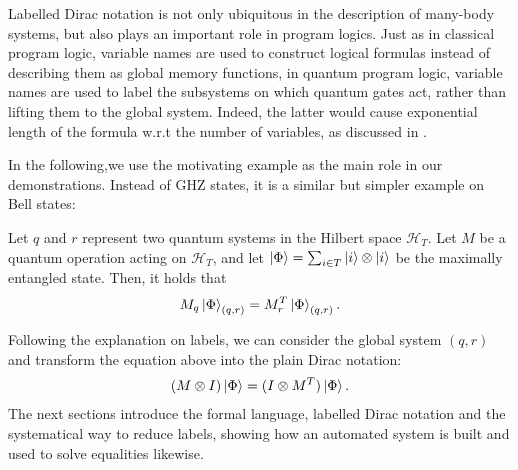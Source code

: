 Labelled Dirac notation is not only ubiquitous in the description of many-body systems, but also plays an important role in program logics. Just as in classical program logic, variable names are used to construct logical formulas instead of describing them as global memory functions, in quantum program logic, variable names are used to label the subsystems on which quantum gates act, rather than lifting them to the global system. Indeed, the latter would cause exponential length of the formula w.r.t the number of variables, as discussed in \cite{QSL_Le_2022}.

In the following,we use the motivating example as the main role in our demonstrations.
Instead of GHZ states, it is a similar but simpler example on Bell states:
\begin{example}
    \label{ex: motivating}
    Let \( q \) and \( r \) represent two quantum systems in the Hilbert space \( \mathcal{H}_T \). Let \( M \) be a quantum operation acting on \( \mathcal{H}_T \), and let \( \ket{\Phi} = \sum_{i \in T} \ket{i} \otimes \ket{i} \) be the maximally entangled state. Then, it holds that
    \[
    M_q \ket{\Phi}_{(q, r)} = M_r^T \ket{\Phi}_{(q, r)}.
    \]
\end{example}
Following the explanation on labels, we can consider the global system $(q,r)$ and transform the equation above into the plain Dirac notation:
\begin{align}
    (M \otimes I) \ket{\Phi} = (I \otimes M^T) \ket{\Phi}.
    \label{eq: motivating plain}
\end{align}
The next sections introduce the formal language, labelled Dirac notation and the systematical way to reduce labels, showing how an automated system is built and used to solve equalities likewise.


